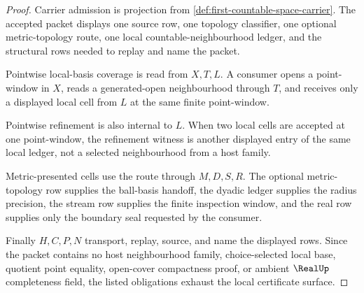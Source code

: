 \begin{proof}
Carrier admission is projection from \autoref{def:first-countable-space-carrier}. The accepted packet displays one source row, one topology classifier, one optional metric-topology route, one local countable-neighbourhood ledger, and the structural rows needed to replay and name the packet.

Pointwise local-basis coverage is read from $X,T,L$. A consumer opens a point-window in $X$, reads a generated-open neighbourhood through $T$, and receives only a displayed local cell from $L$ at the same finite point-window.

Pointwise refinement is also internal to $L$. When two local cells are accepted at one point-window, the refinement witness is another displayed entry of the same local ledger, not a selected neighbourhood from a host family.

Metric-presented cells use the route through $M,D,S,R$. The optional metric-topology row supplies the ball-basis handoff, the dyadic ledger supplies the radius precision, the stream row supplies the finite inspection window, and the real row supplies only the boundary seal requested by the consumer.

Finally $H,C,P,N$ transport, replay, source, and name the displayed rows. Since the packet contains no host neighbourhood family, choice-selected local base, quotient point equality, open-cover compactness proof, or ambient $\RealUp$ completeness field, the listed obligations exhaust the local certificate surface.
\end{proof}

